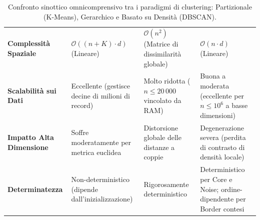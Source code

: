 \begin{table}[htbp]
\begin{tabularx}{\textwidth}{l Y Y Y}
\textbf{Complessità Spaziale} & $\mathcal{O}((n + K) \cdot d)$ (Lineare) & $\mathcal{O}(n^2)$ (Matrice di dissimilarità globale) & $\mathcal{O}(n \cdot d)$ (Lineare) \\
\textbf{Scalabilità sui Dati} & Eccellente (gestisce decine di milioni di record) & Molto ridotta ($n \le 20\,000$ vincolato da RAM) & Buona a moderata (eccellente per $n \le 10^6$ a basse dimensioni) \\
\textbf{Impatto Alta Dimensione} & Soffre moderatamente per metrica euclidea & Distorsione globale delle distanze a coppie & Degenerazione severa (perdita di contrasto di densità locale) \\
\textbf{Determinatezza} & Non-deterministico (dipende dall'inizializzazione) & Rigorosamente deterministico & Deterministico per Core e Noise; ordine-dipendente per Border contesi \\
\bottomrule
\end{tabularx}
\caption{Confronto sinottico omnicomprensivo tra i paradigmi di clustering: Partizionale (K-Means), Gerarchico e Basato su Densità (DBSCAN).}
\label{tab:dm-clustering-all-comparison}
\end{table}
